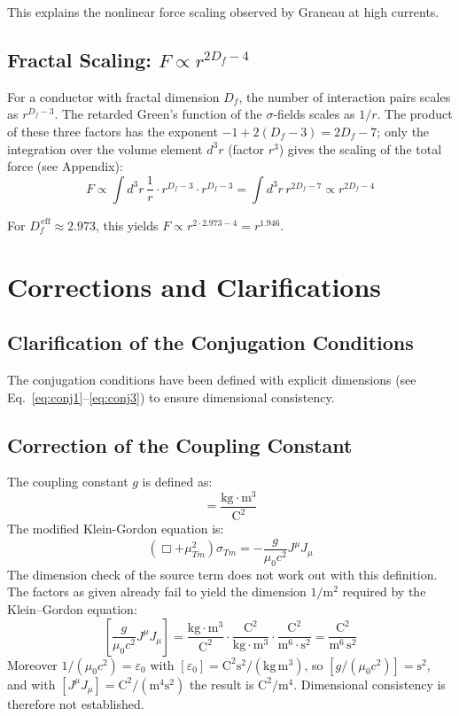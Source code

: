 	This explains the nonlinear force scaling observed by Graneau at high currents.
	
	\subsection{Fractal Scaling: $F \propto r^{2D_f - 4}$}
	For a conductor with fractal dimension $D_f$, the number of interaction pairs scales as $r^{D_f - 3}$. The retarded Green’s function of the $\sigma$-fields scales as $1/r$. The product of these three factors has the exponent $-1 + 2(D_f-3) = 2D_f - 7$; only the integration over the volume element $d^3r$ (factor $r^3$) gives the scaling of the total force (see Appendix):
	\begin{equation}
		F \propto \int d^3r \, \frac{1}{r} \cdot r^{D_f - 3} \cdot r^{D_f - 3} = \int d^3r \, r^{2D_f - 7} \propto r^{2D_f - 4} \label{eq:fractal_scaling}
	\end{equation}

	For $D_f^{\,\text{eff}} \approx 2.973$, this yields $F \propto r^{2 \cdot 2.973 - 4} = r^{1.946}$.
	
	\section{Corrections and Clarifications}
	\subsection{Clarification of the Conjugation Conditions}
	The conjugation conditions have been defined with explicit dimensions (see Eq.~\ref{eq:conj1}–\ref{eq:conj3}) to ensure dimensional consistency.
	
	\subsection{Correction of the Coupling Constant}
	The coupling constant $g$ is defined as:
	\begin{equation}
		[g] = \frac{\text{kg} \cdot \text{m}^3}{\text{C}^2}
	\end{equation}
	The modified Klein-Gordon equation is:
	\begin{equation}
		(\Box + \mu_{Tm}^2) \sigma_{Tm} = -\frac{g}{\mu_0 c^2} J^\mu J_\mu \label{eq:sigma_eq_final}
	\end{equation}
	The dimension check of the source term does not work out with this definition. The factors as given already fail to yield the dimension $1/\text{m}^2$ required by the Klein--Gordon equation:
	\begin{equation}
		\left[\frac{g}{\mu_0 c^2} J^\mu J_\mu\right] = \frac{\text{kg} \cdot \text{m}^3}{\text{C}^2} \cdot \frac{\text{C}^2}{\text{kg} \cdot \text{m}^3} \cdot \frac{\text{C}^2}{\text{m}^6 \cdot \text{s}^2} = \frac{\text{C}^2}{\text{m}^6\,\text{s}^2}
	\end{equation}
	Moreover $1/(\mu_0 c^2) = \varepsilon_0$ with $[\varepsilon_0] = \text{C}^2\text{s}^2/(\text{kg}\,\text{m}^3)$, so $[g/(\mu_0 c^2)] = \text{s}^2$, and with $[J^\mu J_\mu] = \text{C}^2/(\text{m}^4\text{s}^2)$ the result is $\text{C}^2/\text{m}^4$. Dimensional consistency is therefore not established.
	
